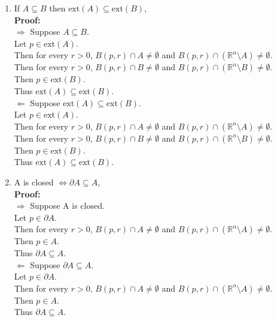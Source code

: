 \documentclass{article}
\begin{document}
\begin{enumerate}
\begin{enumerate}
    \item If $A \subseteq B$ then $\text{ext}(A) \subseteq \text{ext}(B)$,\\
    
\textbf{Proof:} \\
$\Rightarrow$ Suppose $A \subseteq B$. \\
Let $p \in \text{ext}(A)$. \\
Then for every $r > 0$, $B(p,r) \cap A \neq \emptyset$ and $B(p,r) \cap (\mathbb{R}^n \setminus A) \neq \emptyset$. \\
Then for every $r > 0$, $B(p,r) \cap B \neq \emptyset$ and $B(p,r) \cap (\mathbb{R}^n \setminus B) \neq \emptyset$. \\
Then $p \in \text{ext}(B)$. \\
Thus $\text{ext}(A) \subseteq \text{ext}(B)$.\\
$\Leftarrow$ Suppose $\text{ext}(A) \subseteq \text{ext}(B)$. \\
Let $p \in \text{ext}(A)$. \\
Then for every $r > 0$, $B(p,r) \cap A \neq \emptyset$ and $B(p,r) \cap (\mathbb{R}^n \setminus A) \neq \emptyset$. \\
Then for every $r > 0$, $B(p,r) \cap B \neq \emptyset$ and $B(p,r) \cap (\mathbb{R}^n \setminus B) \neq \emptyset$. \\
Then $p \in \text{ext}(B)$. \\
Thus $\text{ext}(A) \subseteq \text{ext}(B)$.\\

    
    \item A is closed $\Leftrightarrow \partial A \subseteq A$,\\
    

\textbf{Proof:} \\
$\Rightarrow$ Suppose A is closed. \\
Let $p \in \partial A$. \\
Then for every $r > 0$, $B(p,r) \cap A \neq \emptyset$ and $B(p,r) \cap (\mathbb{R}^n \setminus A) \neq \emptyset$. \\
Then $p \in A$. \\
Thus $\partial A \subseteq A$.\\
$\Leftarrow$ Suppose $\partial A \subseteq A$. \\
Let $p \in \partial A$. \\
Then for every $r > 0$, $B(p,r) \cap A \neq \emptyset$ and $B(p,r) \cap (\mathbb{R}^n \setminus A) \neq \emptyset$. \\
Then $p \in A$. \\
Thus $\partial A \subseteq A$.\\


\end{enumerate}
\end{enumerate}
\end{document}
